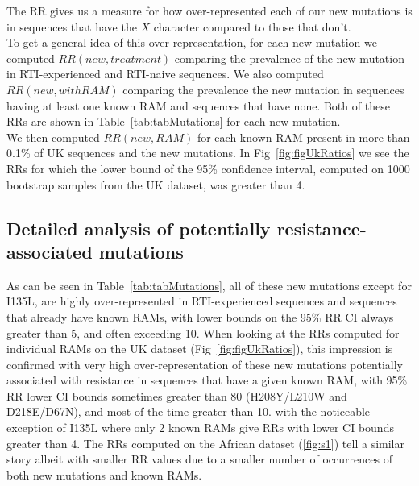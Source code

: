 \documentclass[
  11,
]{scrbook}
\begin{document}
The RR gives us a measure for how over-represented each of our new
mutations is in sequences that have the \(X\) character compared to those
that don't.\\
To get a general idea of this over-representation, for each new mutation
we computed \(RR(new, treatment)\) comparing the prevalence of the new
mutation in RTI-experienced and RTI-naive sequences. We also computed
\(RR(new, with RAM)\) comparing the prevalence the new mutation in
sequences having at least one known RAM and sequences that have none.
Both of these RRs are shown in
Table~\ref{tab:tabMutations}
for each new mutation.\\
We then computed \(RR(new, RAM)\) for each known RAM present in more than
0.1\% of UK sequences and the new mutations. In
Fig~\ref{fig:figUkRatios} we
see the RRs for which the lower bound of the 95\% confidence interval,
computed on 1000 bootstrap samples from the UK dataset, was greater than 4.

\hypertarget{detailed-analysis-of-potentially-resistance-associated-mutations}{%
\subsection{Detailed analysis of potentially resistance-associated mutations}\label{detailed-analysis-of-potentially-resistance-associated-mutations}}

As can be seen in Table~\ref{tab:tabMutations}, all of these new mutations except for I135L,
are highly over-represented in RTI-experienced sequences and sequences
that already have known RAMs, with lower bounds on the 95\% RR CI always
greater than 5, and often exceeding 10. When looking at the RRs computed
for individual RAMs on the UK dataset
(Fig~\ref{fig:figUkRatios}),
this impression is confirmed with very high over-representation of these
new mutations potentially associated with resistance in sequences that
have a given known RAM, with 95\% RR lower CI bounds sometimes greater
than 80 (H208Y/L210W and D218E/D67N), and most of the time greater than 10. with the noticeable exception of I135L where only 2 known RAMs give
RRs with lower CI bounds greater than 4. The RRs computed on the African
dataset (\ref{fig:s1}) tell a similar story albeit with smaller RR values due to a
smaller number of occurrences of both new mutations and known RAMs.\\
\end{document}
